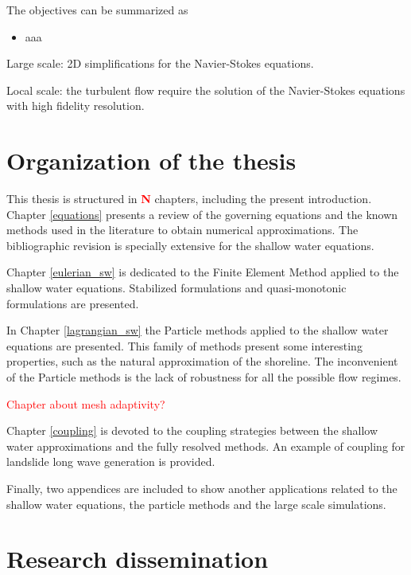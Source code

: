 The objectives can be summarized as
\begin{itemize}
    \item aaa
\end{itemize}

Large scale: 2D simplifications for the Navier-Stokes equations.

Local scale: the turbulent flow require the solution of the Navier-Stokes equations with high fidelity resolution.




\section{Organization of the thesis}


This thesis is structured in \textcolor{red}{\bfseries N} chapters, including the present introduction. Chapter \ref{equations} presents a review of the governing equations and the known methods used in the literature to obtain numerical approximations.
The bibliographic revision is specially extensive for the shallow water equations.

Chapter \ref{eulerian_sw} is dedicated to the Finite Element Method applied to the shallow water equations. Stabilized formulations and quasi-monotonic formulations are presented.

In Chapter \ref{lagrangian_sw} the Particle methods applied to the shallow water equations are presented. This family of methods present some interesting properties, such as the natural approximation of the shoreline. The inconvenient of the Particle methods is the lack of robustness for all the possible flow regimes.

\textcolor{red}{Chapter about mesh adaptivity?}

Chapter \ref{coupling} is devoted to the coupling strategies between the shallow water approximations and the fully resolved methods. An example of coupling for landslide long wave generation is provided.

Finally, two appendices are included to show another applications related to the shallow water equations, the particle methods and the large scale simulations.




\section{Research dissemination}


